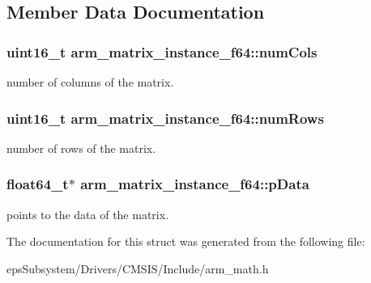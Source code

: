 \subsection{Member Data Documentation}
\hypertarget{structarm__matrix__instance__f64_ab0f0399aff3201880e2d8a447de9a7ee}{
\subsubsection[{num\-Cols}]{\setlength{\rightskip}{0pt plus 5cm}uint16\-\_\-t arm\-\_\-matrix\-\_\-instance\-\_\-f64\-::num\-Cols}}\label{structarm__matrix__instance__f64_ab0f0399aff3201880e2d8a447de9a7ee}
number of columns of the matrix. \hypertarget{structarm__matrix__instance__f64_a8b44d1e5003345047c4ead9e1593bf22}{
\subsubsection[{num\-Rows}]{\setlength{\rightskip}{0pt plus 5cm}uint16\-\_\-t arm\-\_\-matrix\-\_\-instance\-\_\-f64\-::num\-Rows}}\label{structarm__matrix__instance__f64_a8b44d1e5003345047c4ead9e1593bf22}
number of rows of the matrix. \hypertarget{structarm__matrix__instance__f64_a5b2475f8ff1e4818955cdd18bc40a097}{
\subsubsection[{p\-Data}]{\setlength{\rightskip}{0pt plus 5cm}float64\-\_\-t$\ast$ arm\-\_\-matrix\-\_\-instance\-\_\-f64\-::p\-Data}}\label{structarm__matrix__instance__f64_a5b2475f8ff1e4818955cdd18bc40a097}
points to the data of the matrix. 

The documentation for this struct was generated from the following file\-:\begin{DoxyCompactItemize}
\item 
eps\-Subsystem/\-Drivers/\-C\-M\-S\-I\-S/\-Include/arm\-\_\-math.\-h\end{DoxyCompactItemize}
